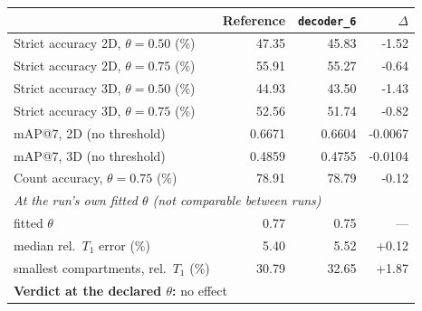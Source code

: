 \renewcommand{\arraystretch}{1.05}
\begin{tabular}{lrrr}
\toprule
 & Reference & \texttt{decoder\_6} & $\Delta$ \\
\midrule
Strict accuracy 2D, $\theta = 0.50$ (\%) & 47.35 & 45.83 & -1.52 \\
Strict accuracy 2D, $\theta = 0.75$ (\%) & 55.91 & 55.27 & -0.64 \\
Strict accuracy 3D, $\theta = 0.50$ (\%) & 44.93 & 43.50 & -1.43 \\
Strict accuracy 3D, $\theta = 0.75$ (\%) & 52.56 & 51.74 & -0.82 \\
\midrule
mAP@7, 2D (no threshold) & 0.6671 & 0.6604 & -0.0067 \\
mAP@7, 3D (no threshold) & 0.4859 & 0.4755 & -0.0104 \\
\midrule
Count accuracy, $\theta = 0.75$ (\%) & 78.91 & 78.79 & -0.12 \\
\midrule
\multicolumn{4}{l}{\emph{At the run's own fitted $\theta$ (not comparable between runs)}} \\
\quad fitted $\theta$ & 0.77 & 0.75 & --- \\
\quad median rel.\ $T_1$ error (\%) & 5.40 & 5.52 & +0.12 \\
\quad smallest compartments, rel.\ $T_1$ (\%) & 30.79 & 32.65 & +1.87 \\
\midrule
\multicolumn{4}{l}{\textbf{Verdict at the declared $\theta$:} no effect} \\
\bottomrule
\end{tabular}
